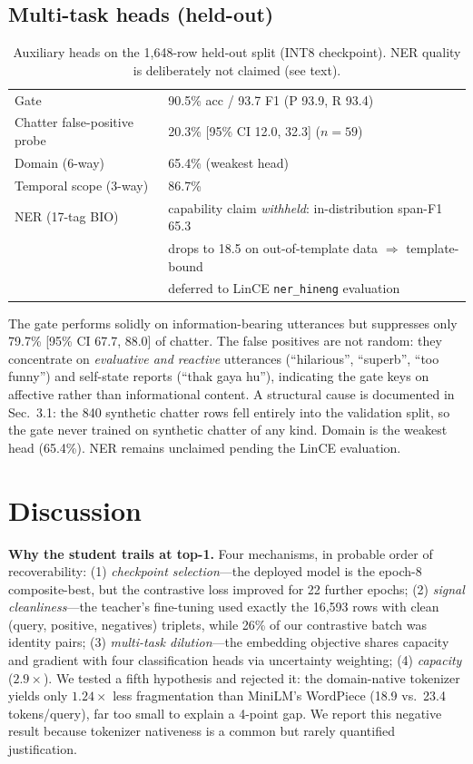 \documentclass[11pt]{article}
\begin{document}
\subsection{Multi-task heads (held-out)}
\begin{table}[t]
\centering\small
\caption{Auxiliary heads on the 1{,}648-row held-out split (INT8 checkpoint). NER quality is deliberately not claimed (see text).}
\begin{tabular}{ll}
\toprule
Gate & 90.5\% acc / 93.7 F1 (P 93.9, R 93.4) \\
Chatter false-positive probe & 20.3\% [95\% CI 12.0, 32.3] ($n{=}59$) \\  %
Domain (6-way) & 65.4\% (weakest head) \\                            %
Temporal scope (3-way) & 86.7\% \\
NER (17-tag BIO) & capability claim \emph{withheld}: in-distribution span-F1 65.3 \\
 & drops to 18.5 on out-of-template data $\Rightarrow$ template-bound \\
 & deferred to LinCE \texttt{ner\_hineng} evaluation \\              %
\bottomrule
\end{tabular}
\end{table}

The gate performs solidly on information-bearing utterances but suppresses only 79.7\% [95\% CI 67.7, 88.0] of chatter. The false positives are not random: they concentrate on \emph{evaluative and reactive} utterances (``hilarious'', ``superb'', ``too funny'') and self-state reports (``thak gaya hu''), indicating the gate keys on affective rather than informational content. A structural cause is documented in Sec.~3.1: the 840 synthetic chatter rows fell entirely into the validation split, so the gate never trained on synthetic chatter of any kind. Domain is the weakest head (65.4\%). NER remains unclaimed pending the LinCE evaluation.

\section{Discussion}
\label{sec:discussion}
\textbf{Why the student trails at top-1.} Four mechanisms, in probable order of recoverability: (1) \emph{checkpoint selection}---the deployed model is the epoch-8 composite-best, but the contrastive loss improved for 22 further epochs; (2) \emph{signal cleanliness}---the teacher's fine-tuning used exactly the 16{,}593 rows with clean (query, positive, negatives) triplets, while 26\% of our contrastive batch was identity pairs; (3) \emph{multi-task dilution}---the embedding objective shares capacity and gradient with four classification heads via uncertainty weighting; (4) \emph{capacity} ($2.9\times$). We tested a fifth hypothesis and rejected it: the domain-native tokenizer yields only $1.24\times$ less fragmentation than MiniLM's WordPiece (18.9 vs.\ 23.4 tokens/query), far too small to explain a 4-point gap. We report this negative result because tokenizer nativeness is a common but rarely quantified justification.
\end{document}
